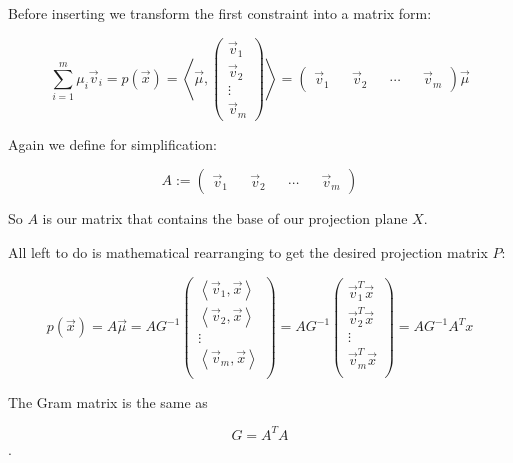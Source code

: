 \documentclass{article}
\newcommand{\lrangle}[1]{\left\langle #1 \right\rangle}
\begin{document}
Before inserting we transform the first constraint into a matrix form:

	\begin{equation}
		\sum_{i=1}^{m}{\mu _i \vec{v}_i} = p(\vec{x}) = 
		\lrangle{\vec{\mu},
		\begin{pmatrix}
			\vec{v}_1 \\
			\vec{v}_2 \\
			\vdots \\
			\vec{v}_m
		\end{pmatrix}
		} =
		\begin{pmatrix}
			\vec{v}_1 &&
			\vec{v}_2 &&
			\cdots &&
			\vec{v}_m
		\end{pmatrix}
		\vec{\mu}
	\end{equation}

Again we define for simplification:

	\begin{equation}
		A :=
		\begin{pmatrix}
			\vec{v}_1 &&
			\vec{v}_2 &&
			\cdots &&
			\vec{v}_m
		\end{pmatrix}
	\end{equation}

So \(A\) is our matrix that contains the base of our projection plane \(X\).

All left to do is mathematical rearranging to get the desired projection matrix \(P\):

	\begin{equation}
		p(\vec{x}) = A\vec{\mu} = AG^{-1}
		\begin{pmatrix}
			\lrangle{ \vec{v}_1, \vec{x} } \\
			\lrangle{ \vec{v}_2, \vec{x} } \\
			\vdots \\
			\lrangle{ \vec{v}_m, \vec{x} } \\
			\end{pmatrix}
		= AG^{-1}
		\begin{pmatrix}
			\vec{v}_{1}^{T} \vec{x} \\
			\vec{v}_{2}^{T} \vec{x} \\
			\vdots \\
			\vec{v}_{m}^{T} \vec{x} \\
		\end{pmatrix}
		= AG^{-1}A^T x
	\end{equation}

The Gram matrix is the same as

	\begin{equation}
		G = A^T A
	\end{equation}.
\end{document}
